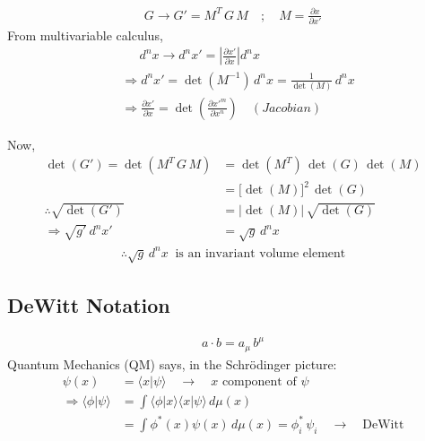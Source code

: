 \documentclass[14pt]{article} %
\begin{document}
\begin{align*}
G \to G' = M^T\, G\, M \quad ; \quad M = \frac{\partial x}{\partial x'}
\end{align*}
From multivariable calculus,
\begin{align*}
&~~ \quad d^n x \to d^n x' = \left| \frac{\partial x'}{\partial x} \right| d^n x \\
&\Rightarrow d^n x' = \det(M^{-1})\, d^n x = \frac{1}{\det(M)}\, d^n x \\
&\Rightarrow \frac{\partial x'}{\partial x} = \det\left(\frac{\partial x'^m}{\partial x^n}\right)
\quad (Jacobian)
\end{align*}

Now,
\begin{align*}
\det(G') = \det(M^T\, G\, M) &= \det(M^T)\,\det(G)\,\det(M) \\
&= \bigl[\det(M)\bigr]^2\, \det(G) \\
\therefore\sqrt{\det(G')} &= \lvert \det(M) \rvert\, \sqrt{\det(G)} \\
\Rightarrow \sqrt{g'}\, d^n x' &= \sqrt{g}\, d^n x
\end{align*}
\begin{align*}
\therefore\sqrt{g}\, d^n x ~\text{ is an invariant volume element}
\end{align*}
\subsection{DeWitt Notation}
\begin{align*} a \cdot b = a_\mu\, b^\mu \end{align*}
Quantum Mechanics (QM) says, in the Schrödinger picture:
\begin{align*}
\psi(x) &= \langle x | \psi \rangle \quad \to \quad x\text{ component of } \psi \\
\Rightarrow \langle \phi | \psi \rangle &= \int \langle \phi | x \rangle \langle x | \psi \rangle \, d\mu(x) \\
&= \int \phi^*(x) \psi(x) \, d\mu(x) = \phi_i^* \,\psi_i \quad \to \quad \text{DeWitt}
\end{align*}
\end{document}
